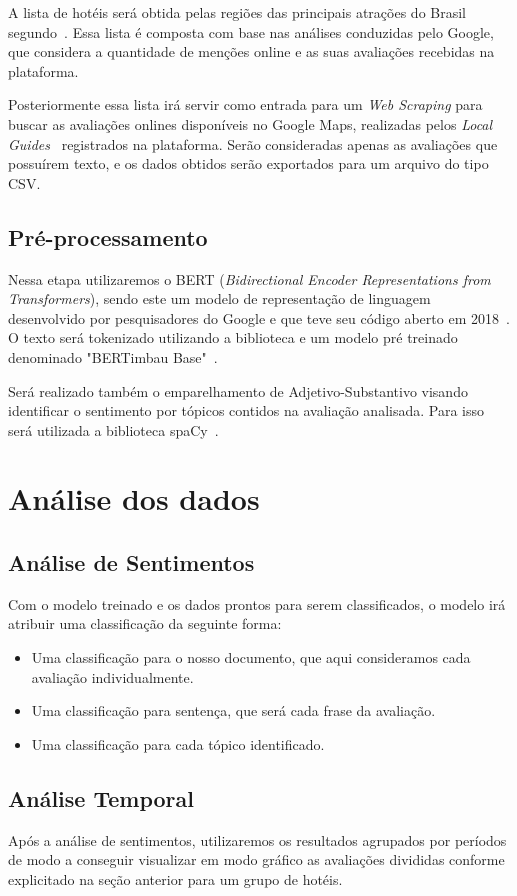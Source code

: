 A lista de hotéis será obtida pelas regiões das principais atrações do Brasil segundo~\cite{googleFlights2022destinos}. Essa lista é composta com base nas análises conduzidas pelo Google, que considera a quantidade de menções online e as suas avaliações recebidas na plataforma.

Posteriormente essa lista irá servir como entrada para um \emph{Web Scraping} para buscar as avaliações onlines disponíveis no Google Maps, realizadas pelos \emph{Local Guides}~\cite{google2022localguides} registrados na plataforma. Serão consideradas apenas as avaliações que possuírem texto, e os dados obtidos serão exportados para um arquivo do tipo CSV.


\subsection{Pré-processamento}
\label{subsec:pre_processamento}


Nessa etapa utilizaremos o BERT (\emph{Bidirectional Encoder Representations from Transformers}), sendo este um modelo de representação de linguagem desenvolvido por pesquisadores do Google e que teve seu código aberto em 2018~\cite{hugoZanini2021mediu}. O texto será tokenizado utilizando a biblioteca e um modelo pré treinado denominado "BERTimbau Base"~\cite{souza2020bertimbau}.

Será realizado também o emparelhamento de Adjetivo-Substantivo visando identificar o sentimento por tópicos contidos na avaliação analisada. Para isso será utilizada a biblioteca spaCy~\cite{montani2022spacy}. 

\section{Análise dos dados}

\subsection{Análise de Sentimentos}
\label{subsec:analise_sentimentos}

Com o modelo treinado e os dados prontos para serem classificados, o modelo irá atribuir uma classificação da seguinte forma:
\begin{itemize}
    \item Uma classificação para o nosso documento, que aqui consideramos cada avaliação individualmente.
    \item Uma classificação para sentença, que será cada frase da  avaliação.
    \item Uma classificação para cada tópico identificado.
\end{itemize}

\subsection{Análise Temporal}
\label{subsec:analise_temporal}
Após a análise de sentimentos, utilizaremos os resultados agrupados por períodos de modo a conseguir visualizar em modo gráfico as avaliações divididas conforme explicitado na seção anterior para um grupo de hotéis.
